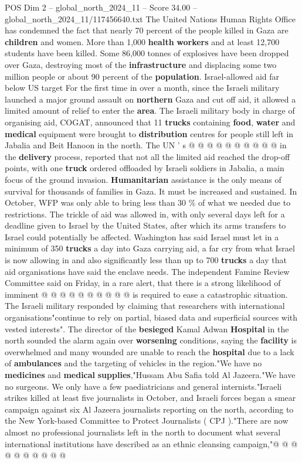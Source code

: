 \begin{textsample}{POS Dim 2 – global\_north\_2024\_11 – Score 34.00 – global\_north\_2024\_11/117456640.txt}
The United Nations Human Rights Office has condemned the fact that nearly 70 percent of the people killed in Gaza are \textbf{children} and women.
More than 1,000 \textbf{health} \textbf{workers} and at least 12,700 students have been killed.
Some 86,000 tonnes of explosives have been dropped over Gaza, destroying most of the \textbf{infrastructure} and displacing some two million people or about 90 percent of the \textbf{population}.
Israel-allowed aid far below US target For the first time in over a month, since the Israeli military launched a major ground assault on \textbf{northern} Gaza and cut off aid, it allowed a limited amount of relief to enter the \textbf{area}.
The Israeli military body in charge of organising aid, COGAT, announced that 11 \textbf{trucks} containing \textbf{food}, \textbf{water} and \textbf{medical} equipment were brought to \textbf{distribution} centres for people still left in Jabalia and Beit Hanoon in the north.
The UN ' s @ @ @ @ @ @ @ @ @ @ in the \textbf{delivery} process, reported that not all the limited aid reached the drop-off points, with one \textbf{truck} ordered offloaded by Israeli soldiers in Jabalia, a main focus of the ground invasion. \textbf{Humanitarian} assistance is the only means of survival for thousands of families in Gaza.
It must be increased and sustained.
In October, WFP was only able to bring less than 30 \% of what we needed due to restrictions.
The trickle of aid was allowed in, with only several days left for a deadline given to Israel by the United States, after which its arms transfers to Israel could potentially be affected.
Washington has said Israel must let in a minimum of 350 \textbf{trucks} a day into Gaza carrying aid, a far cry from what Israel is now allowing in and also significantly less than up to 700 \textbf{trucks} a day that aid organisations have said the enclave needs.
The independent Famine Review Committee said on Friday, in a rare alert, that there is a strong likelihood of imminent @ @ @ @ @ @ @ @ @ @ is required to ease a catastrophic situation.
The Israeli military responded by claiming that researchers with international organisations"continue to rely on partial, biased data and superficial sources with vested interests".
The director of the \textbf{besieged} Kamal Adwan \textbf{Hospital} in the north sounded the alarm again over \textbf{worsening} conditions, saying the \textbf{facility} is overwhelmed and many wounded are unable to reach the \textbf{hospital} due to a lack of \textbf{ambulances} and the targeting of vehicles in the region."We have no \textbf{medicines} and \textbf{medical} \textbf{supplies},"Hussam Abu Safia told Al Jazeera."We have no surgeons.
We only have a few paediatricians and general internists."Israeli strikes killed at least five journalists in October, and Israeli forces began a smear campaign against six Al Jazeera journalists reporting on the north, according to the New York-based Committee to Protect Journalists ( CPJ )."There are now almost no professional journalists left in the north to document what several international institutions have described as an ethnic cleansing campaign,"@ @ @ @ @ @ @ @ @ @


\end{textsample}
